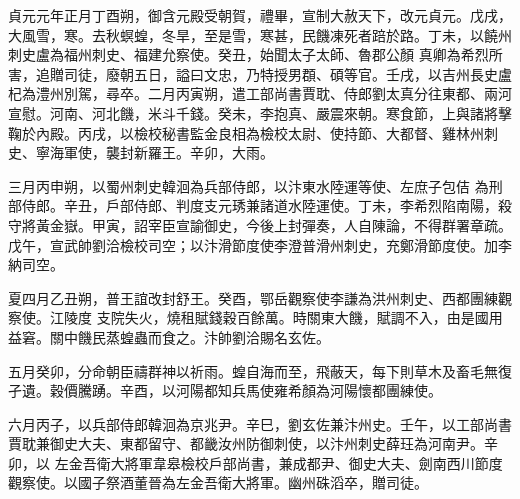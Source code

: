 \begin{pinyinscope}
 貞元元年正月丁酉朔，御含元殿受朝賀，禮畢，宣制大赦天下，改元貞元。戊戌，大風雪，寒。去秋螟蝗，冬旱，至是雪，寒甚，民饑凍死者踣於路。丁未，以饒州刺史盧為福州刺史、福建允察使。癸丑，始聞太子太師、魯郡公顏
 真卿為希烈所害，追贈司徒，廢朝五日，謚曰文忠，乃特授男頵、碩等官。壬戌，以吉州長史盧杞為澧州別駕，尋卒。二月丙寅朔，遣工部尚書賈耽、侍郎劉太真分往東都、兩河宣慰。河南、河北饑，米斗千錢。癸未，李抱真、嚴震來朝。寒食節，上與諸將擊鞠於內殿。丙戌，以檢校秘書監金良相為檢校太尉、使持節、大都督、雞林州刺史、寧海軍使，襲封新羅王。辛卯，大雨。



 三月丙申朔，以蜀州刺史韓洄為兵部侍郎，以汴東水陸運等使、左庶子包佶
 為刑部侍郎。辛丑，戶部侍郎、判度支元琇兼諸道水陸運使。丁未，李希烈陷南陽，殺守將黃金嶽。甲寅，詔宰臣宣諭御史，今後上封彈奏，人自陳論，不得群署章疏。戊午，宣武帥劉洽檢校司空；以汴滑節度使李澄普滑州刺史，充鄭滑節度使。加李納司空。



 夏四月乙丑朔，普王誼改封舒王。癸酉，鄂岳觀察使李謙為洪州刺史、西都團練觀察使。江陵度
 支院失火，燒租賦錢穀百餘萬。時關東大饑，賦調不入，由是國用益窘。關中饑民蒸蝗蟲而食之。汴帥劉洽賜名玄佐。



 五月癸卯，分命朝臣禱群神以祈雨。蝗自海而至，飛蔽天，每下則草木及畜毛無復孑遺。穀價騰踴。辛酉，以河陽都知兵馬使雍希顏為河陽懷都團練使。



 六月丙子，以兵部侍郎韓洄為京兆尹。辛巳，劉玄佐兼汴州史。壬午，以工部尚書賈耽兼御史大夫、東都留守、都畿汝州防御刺使，以汴州刺史薛玨為河南尹。辛卯，以
 左金吾衛大將軍韋皋檢校戶部尚書，兼成都尹、御史大夫、劍南西川節度觀察使。以國子祭酒董晉為左金吾衛大將軍。幽州硃滔卒，贈司徒。




\end{pinyinscope}
